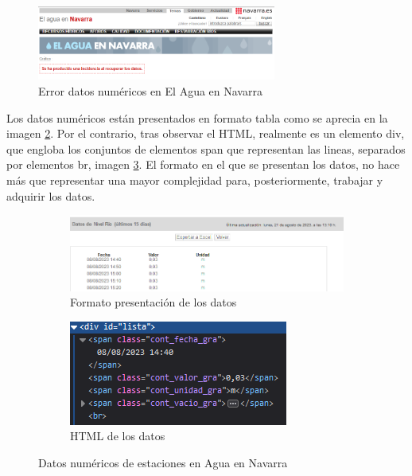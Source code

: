 \begin{figure} [H]
	\centering
	\includegraphics[width=0.7\textwidth]{fig/ErrorAguaEnNavarra.png}
	\caption[Error al cargar directamente la página de datos numéricos en El Agua en Navarra]{Error datos numéricos en El Agua en Navarra}
	\label{fig:ej5}
\end{figure}

Los datos numéricos están presentados en formato tabla como se aprecia en la imagen \ref{fig:sub3}. Por el contrario, tras observar el HTML, realmente es un elemento div, que engloba los conjuntos de elementos span que representan las lineas, separados por elementos br, imagen \ref{fig:sub4}. El formato en el que se presentan los datos, no hace más que representar una mayor complejidad para, posteriormente, trabajar y adquirir los datos. 

\begin{figure} [H]
	\centering
	\begin{subfigure}{.5\textwidth}
		\centering
		\includegraphics[width=.9\linewidth]{fig/AguaEnNavarraData.png}
		\caption{Formato presentación de los datos}
		\label{fig:sub3}
	\end{subfigure}%
	\begin{subfigure}{.5\textwidth}
		\centering
		\includegraphics[width=.7\linewidth]{fig/AguaEnNavarraDataHTML.png}
		\caption{HTML de los datos}
		\label{fig:sub4}
	\end{subfigure}
	\caption{Datos numéricos de estaciones en Agua en Navarra}
	\label{fig:ej26}
\end{figure}

